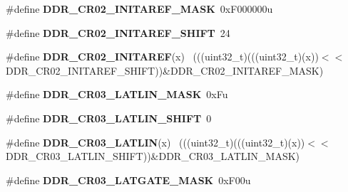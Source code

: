 \begin{DoxyCompactItemize}
\item 
\hypertarget{group___d_d_r___register___masks_gae1911f79275721ac8533ec303f801cd7}{}\#define {\bfseries D\+D\+R\+\_\+\+C\+R02\+\_\+\+I\+N\+I\+T\+A\+R\+E\+F\+\_\+\+M\+A\+S\+K}~0x\+F000000u\label{group___d_d_r___register___masks_gae1911f79275721ac8533ec303f801cd7}

\item 
\hypertarget{group___d_d_r___register___masks_gaf507d19890039bc08a1740fd8bb412ed}{}\#define {\bfseries D\+D\+R\+\_\+\+C\+R02\+\_\+\+I\+N\+I\+T\+A\+R\+E\+F\+\_\+\+S\+H\+I\+F\+T}~24\label{group___d_d_r___register___masks_gaf507d19890039bc08a1740fd8bb412ed}

\item 
\hypertarget{group___d_d_r___register___masks_ga9fc2511d77facfa376315085d8405156}{}\#define {\bfseries D\+D\+R\+\_\+\+C\+R02\+\_\+\+I\+N\+I\+T\+A\+R\+E\+F}(x)                                      ~(((uint32\+\_\+t)(((uint32\+\_\+t)(x))$<$$<$D\+D\+R\+\_\+\+C\+R02\+\_\+\+I\+N\+I\+T\+A\+R\+E\+F\+\_\+\+S\+H\+I\+F\+T))\&D\+D\+R\+\_\+\+C\+R02\+\_\+\+I\+N\+I\+T\+A\+R\+E\+F\+\_\+\+M\+A\+S\+K)\label{group___d_d_r___register___masks_ga9fc2511d77facfa376315085d8405156}

\item 
\hypertarget{group___d_d_r___register___masks_ga00cc61a4c6d5d4c1e42ecc0ff863f05b}{}\#define {\bfseries D\+D\+R\+\_\+\+C\+R03\+\_\+\+L\+A\+T\+L\+I\+N\+\_\+\+M\+A\+S\+K}~0x\+Fu\label{group___d_d_r___register___masks_ga00cc61a4c6d5d4c1e42ecc0ff863f05b}

\item 
\hypertarget{group___d_d_r___register___masks_gafc9753c47eb65ff46d60bac1fe6c6e06}{}\#define {\bfseries D\+D\+R\+\_\+\+C\+R03\+\_\+\+L\+A\+T\+L\+I\+N\+\_\+\+S\+H\+I\+F\+T}~0\label{group___d_d_r___register___masks_gafc9753c47eb65ff46d60bac1fe6c6e06}

\item 
\hypertarget{group___d_d_r___register___masks_ga3d810da151c9a158abd7bf28cc945172}{}\#define {\bfseries D\+D\+R\+\_\+\+C\+R03\+\_\+\+L\+A\+T\+L\+I\+N}(x)                                          ~(((uint32\+\_\+t)(((uint32\+\_\+t)(x))$<$$<$D\+D\+R\+\_\+\+C\+R03\+\_\+\+L\+A\+T\+L\+I\+N\+\_\+\+S\+H\+I\+F\+T))\&D\+D\+R\+\_\+\+C\+R03\+\_\+\+L\+A\+T\+L\+I\+N\+\_\+\+M\+A\+S\+K)\label{group___d_d_r___register___masks_ga3d810da151c9a158abd7bf28cc945172}

\item 
\hypertarget{group___d_d_r___register___masks_ga28a0edf3761e0e0205024df33f87e01a}{}\#define {\bfseries D\+D\+R\+\_\+\+C\+R03\+\_\+\+L\+A\+T\+G\+A\+T\+E\+\_\+\+M\+A\+S\+K}~0x\+F00u\label{group___d_d_r___register___masks_ga28a0edf3761e0e0205024df33f87e01a}


\end{DoxyCompactItemize}
